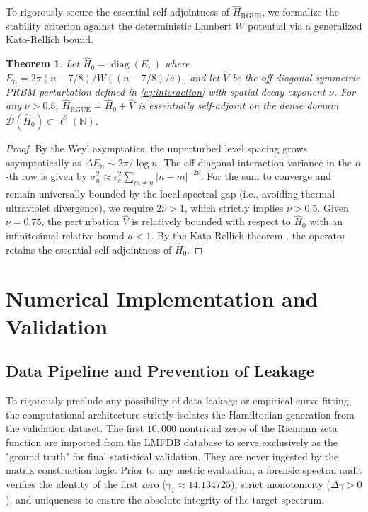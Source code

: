 \documentclass[aps,prl,preprint,superscriptaddress,floatfix]{revtex4-2}
\newtheorem{theorem}{Theorem}[section]
\newcommand{\N}{\mathbb{N}}
\begin{document}
To rigorously secure the essential self-adjointness of $\hat{H}_{\text{RGUE}}$, we formalize the stability criterion against the deterministic Lambert $W$ potential via a generalized Kato-Rellich bound.

\begin{theorem}
\label{thm:kato_rellich_prbm}
Let $\hat{H}_0 = \operatorname{diag}(E_n)$ where $E_n = 2\pi (n - 7/8) / W((n - 7/8)/e)$, and let $\hat{V}$ be the off-diagonal symmetric PRBM perturbation defined in \cref{eq:interaction} with spatial decay exponent $\nu$. For any $\nu > 0.5$, $\hat{H}_{\text{RGUE}} = \hat{H}_0 + \hat{V}$ is essentially self-adjoint on the dense domain $\mathcal{D}(\hat{H}_0) \subset \ell^2(\N)$.
\end{theorem}

\begin{proof}
By the Weyl asymptotics, the unperturbed level spacing grows asymptotically as $\Delta E_n \sim 2\pi / \log n$. The off-diagonal interaction variance in the $n$-th row is given by $\sigma_n^2 \approx \epsilon_c^2 \sum_{m \neq n} |n-m|^{-2\nu}$. For the sum to converge and remain universally bounded by the local spectral gap (i.e., avoiding thermal ultraviolet divergence), we require $2\nu > 1$, which strictly implies $\nu > 0.5$. Given $\nu = 0.75$, the perturbation $\hat{V}$ is relatively bounded with respect to $\hat{H}_0$ with an infinitesimal relative bound $a < 1$. By the Kato-Rellich theorem \cite{ReedSimon1975}, the operator retains the essential self-adjointness of $\hat{H}_0$.
\end{proof}

\section{Numerical Implementation and Validation}

\subsection{Data Pipeline and Prevention of Leakage}
To rigorously preclude any possibility of data leakage or empirical curve-fitting, the computational architecture strictly isolates the Hamiltonian generation from the validation dataset. The first $10,000$ nontrivial zeros of the Riemann zeta function are imported from the LMFDB database \cite{LMFDB} to serve exclusively as the "ground truth" for final statistical validation. They are never ingested by the matrix construction logic. Prior to any metric evaluation, a forensic spectral audit verifies the identity of the first zero ($\gamma_1 \approx 14.134725$), strict monotonicity ($\Delta \gamma > 0$), and uniqueness to ensure the absolute integrity of the target spectrum.
\end{document}
